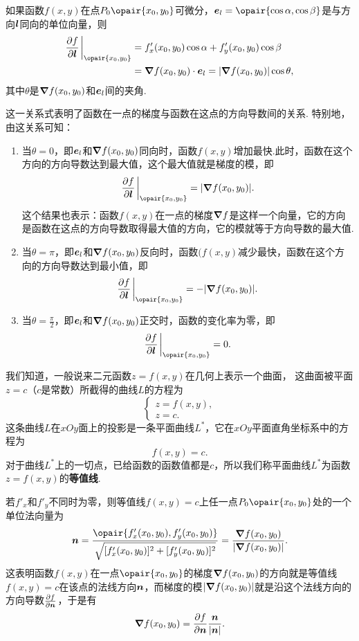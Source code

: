 \begin{theorem}\label{theorem:多元函数微分法.方向导数与梯度的关系}
如果函数\(f(x,y)\)在点\(P_0\opair{x_0,y_0}\)可微分，\(\mat{e}_l=\opair{\cos\alpha,\cos\beta}\)是与方向\(\boldsymbol{l}\)同向的单位向量，则\begin{equation}
\begin{split}
\pdv{f}{\mat{l}}\eval_{\opair{x_0,y_0}}
&= f'_x(x_0,y_0) \cos\alpha + f'_y(x_0,y_0) \cos\beta \\
&= \grad{f}(x_0,y_0) \cdot \mat{e}_l
= \abs{\grad{f}(x_0,y_0)} \cos\theta,
\end{split}
\end{equation}其中\(\theta\)是\(\grad{f}(x_0,y_0)\)和\(\boldsymbol{e}_l\)间的夹角.
\end{theorem}
这一关系式表明了函数在一点的梯度与函数在这点的方向导数间的关系.
特别地，由这关系可知：
\begin{enumerate}
\item 当\(\theta=0\)，即\(\boldsymbol{e}_l\)和\(\grad{f}(x_0,y_0)\)同向时，函数\(f(x,y)\)增加最快.此时，函数在这个方向的方向导数达到最大值，这个最大值就是梯度的模，即\[
\pdv{f}{\mat{l}}\eval_{\opair{x_0,y_0}} = \abs{\grad{f}(x_0,y_0)}.
\]这个结果也表示：函数\(f(x,y)\)在一点的梯度\(\grad{f}\)是这样一个向量，它的方向是函数在这点的方向导数取得最大值的方向，它的模就等于方向导数的最大值.

\item 当\(\theta=\pi\)，即\(\boldsymbol{e}_l\)和\(\grad{f}(x_0,y_0)\)反向时，函数\((f(x,y)\)减少最快，函数在这个方向的方向导数达到最小值，即\[
\pdv{f}{\mat{l}}\eval_{\opair{x_0,y_0}} = -\abs{\grad{f}(x_0,y_0)}.
\]

\item 当\(\theta=\frac{\pi}{2}\)，即\(\boldsymbol{e}_l\)和\(\grad{f}(x_0,y_0)\)正交时，函数的变化率为零，即\[
\pdv{f}{\mat{l}}\eval_{\opair{x_0,y_0}} = 0.
\]
\end{enumerate}

我们知道，一般说来二元函数\(z = f(x,y)\)在几何上表示一个曲面，%
这曲面被平面\(z = c\)（\(c\)是常数）所截得的曲线\(L\)的方程为\[
\left\{ \begin{array}{l}
z = f(x,y), \\
z = c.
\end{array} \right.
\]这条曲线\(L\)在\(xOy\)面上的投影是一条平面曲线\(L^*\)，它在\(xOy\)平面直角坐标系中的方程为\[
f(x,y) = c.
\]对于曲线\(L^*\)上的一切点，已给函数的函数值都是\(c\)，所以我们称平面曲线\(L^*\)为函数\(z = f(x,y)\)的\textbf{等值线}.

若\(f'_x\)和\(f'_y\)不同时为零，则等值线\(f(x,y) = c\)上任一点\(P_0\opair{x_0,y_0}\)处的一个单位法向量为\[
\mat{n}
= \frac{\opair{f'_x(x_0,y_0),f'_y(x_0,y_0)}}{\sqrt{[f'_x(x_0,y_0)]^2+[f'_y(x_0,y_0)]^2}}
= \frac{\grad f(x_0,y_0)}{\abs{\grad f(x_0,y_0)}}.
\]
这表明函数\(f(x,y)\)在一点\(\opair{x_0,y_0}\)的梯度\(\grad f(x_0,y_0)\)的方向就是等值线\(f(x,y) = c\)在该点的法线方向\(\boldsymbol{n}\)，而梯度的模\(\abs{\grad f(x_0,y_0)}\)就是沿这个法线方向的方向导数\(\pdv{f}{\boldsymbol{n}}\)，于是有\[
\grad f(x_0,y_0) = \pdv{f}{\boldsymbol{n}} \frac{\boldsymbol{n}}{\abs{\boldsymbol{n}}}.
\]

